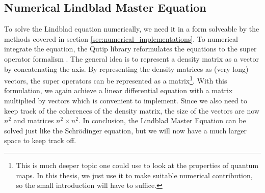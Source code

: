 

\subsection{Numerical Lindblad Master Equation}
To solve the Lindblad equation numerically, we need it in a form solveable by the methods covered in section \ref{sec:numerical_implementations}. To numerical integrate the equation, the Qutip library reformulates the equations to the super operator formalism \cite{johansson_qutip_2012}. The general idea is to represent a density matrix as a vector by concatenating the axis. By representing the density matrices as (very long) vectors, the super operators can be represented as a matrix\footnote{This is much deeper topic one could use to look at the properties of quantum maps. In this thesis, we just use it to make suitable numerical contribution, so the small introduction will have to suffice. }. With this formulation, we again achieve a linear differential equation with a matrix multiplied by vectors which is convenient to implement. Since we also need to keep track of the coherences of the density matrix, the size of the vectors are now $n^2$ and matrices $n^2\times n^2$. In conclusion, the Lindblad Master Equation can be solved just like the Schrödinger equation, but we will now have a much larger space to keep track off. 

